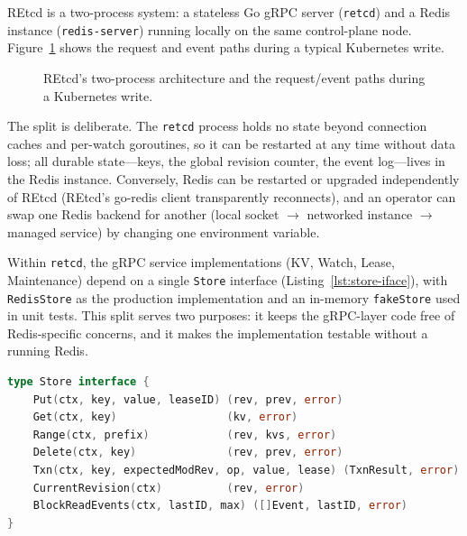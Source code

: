 REtcd is a two-process system: a stateless Go gRPC server (\texttt{retcd}) and a Redis instance (\texttt{redis-server}) running locally on the same control-plane node. Figure~\ref{fig:design-arch} shows the request and event paths during a typical Kubernetes write.

\begin{figure}[h]
    \centering
    \caption{REtcd's two-process architecture and the request/event paths during a Kubernetes write.}
    \label{fig:design-arch}
\end{figure}

The split is deliberate. The \texttt{retcd} process holds no state beyond connection caches and per-watch goroutines, so it can be restarted at any time without data loss; all durable state---keys, the global revision counter, the event log---lives in the Redis instance. Conversely, Redis can be restarted or upgraded independently of REtcd (REtcd's go-redis client transparently reconnects), and an operator can swap one Redis backend for another (local socket $\rightarrow$ networked instance $\rightarrow$ managed service) by changing one environment variable.

Within \texttt{retcd}, the gRPC service implementations (KV, Watch, Lease, Maintenance) depend on a single \texttt{Store} interface (Listing~\ref{lst:store-iface}), with \texttt{RedisStore} as the production implementation and an in-memory \texttt{fakeStore} used in unit tests. This split serves two purposes: it keeps the gRPC-layer code free of Redis-specific concerns, and it makes the implementation testable without a running Redis.

\begin{lstlisting}[language=Go,caption={The \texttt{Store} interface (excerpt from \texttt{server/types.go}).},label=lst:store-iface]
type Store interface {
    Put(ctx, key, value, leaseID) (rev, prev, error)
    Get(ctx, key)                 (kv, error)
    Range(ctx, prefix)            (rev, kvs, error)
    Delete(ctx, key)              (rev, prev, error)
    Txn(ctx, key, expectedModRev, op, value, lease) (TxnResult, error)
    CurrentRevision(ctx)          (rev, error)
    BlockReadEvents(ctx, lastID, max) ([]Event, lastID, error)
}
\end{lstlisting}

